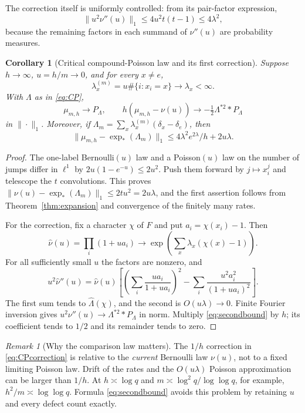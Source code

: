 \documentclass[11pt]{article}
\newtheorem{corollary}[theorem]{Corollary}
\theoremstyle{remark}\newtheorem{remark}[theorem]{Remark}
\begin{document}
The correction itself is uniformly controlled: from its pair-factor expression,
\begin{equation}\label{eq:derivativebound}
 \|u^2\nu''(u)\|_1\le4u^2t(t-1)\le4\lambda^2,
\end{equation}
because the remaining factors in each summand of $\nu''(u)$ are probability measures.

\begin{corollary}[Critical compound-Poisson law and its first correction]\label{cor:CP}
Suppose $h\to\infty$, $u=h/m\to0$, and for every $x\ne e$,
\[
 \lambda_x^{(m)}=u\#\{i:x_i=x\}\longrightarrow\lambda_x<\infty.
\]
With $\Lambda$ as in \eqref{eq:CP},
\begin{equation}\label{eq:CPcorrection}
 \mu_{m,h}\longrightarrow P_\Lambda,\qquad
 h(\mu_{m,h}-\nu(u))
 \longrightarrow-\tfrac12\Lambda^{*2}*P_\Lambda
\end{equation}
in $\|\cdot\|_1$. Moreover, if $\Lambda_m=\sum_x\lambda_x^{(m)}(\delta_x-\delta_e)$, then
\[
 \|\mu_{m,h}-\exp_*(\Lambda_m)\|_1
 \le4\lambda^2e^{2\lambda}/h+2u\lambda.
\]
\end{corollary}
\begin{proof}
The one-label Bernoulli$(u)$ law and a Poisson$(u)$ law on the number of jumps differ in $\ell^1$ by $2u(1-e^{-u})\le2u^2$. Push them forward by $j\mapsto x_i^j$ and telescope the $t$ convolutions. This proves
$\|\nu(u)-\exp_*(\Lambda_m)\|_1\le2tu^2=2u\lambda$, and the first assertion follows from Theorem~\ref{thm:expansion} and convergence of the finitely many rates.

For the correction, fix a character $\chi$ of $F$ and put $a_i=\chi(x_i)-1$. Then
\[
 \widehat\nu(u)=\prod_i(1+ua_i)
 \longrightarrow\exp\left(\sum_x\lambda_x(\chi(x)-1)\right).
\]
For all sufficiently small $u$ the factors are nonzero, and
\[
 u^2\widehat\nu''(u)=\widehat\nu(u)
 \left[\left(\sum_i\frac{ua_i}{1+ua_i}\right)^2
       -\sum_i\frac{u^2a_i^2}{(1+ua_i)^2}\right].
\]
The first sum tends to $\widehat\Lambda(\chi)$, and the second is $O(u\lambda)\to0$. Finite Fourier inversion gives
$u^2\nu''(u)\to\Lambda^{*2}*P_\Lambda$ in norm. Multiply \eqref{eq:secondbound} by $h$; its coefficient tends to $1/2$ and its remainder tends to zero.
\end{proof}

\begin{remark}[Why the comparison law matters]
The $1/h$ correction in \eqref{eq:CPcorrection} is relative to the \emph{current} Bernoulli law $\nu(u)$, not to a fixed limiting Poisson law. Drift of the rates and the $O(u\lambda)$ Poisson approximation can be larger than $1/h$. At $h\asymp\log q$ and $m\asymp\log^2q/\log\log q$, for example, $h^2/m\asymp\log\log q$. Formula \eqref{eq:secondbound} avoids this problem by retaining $u$ and every defect count exactly.
\end{remark}
\end{document}
